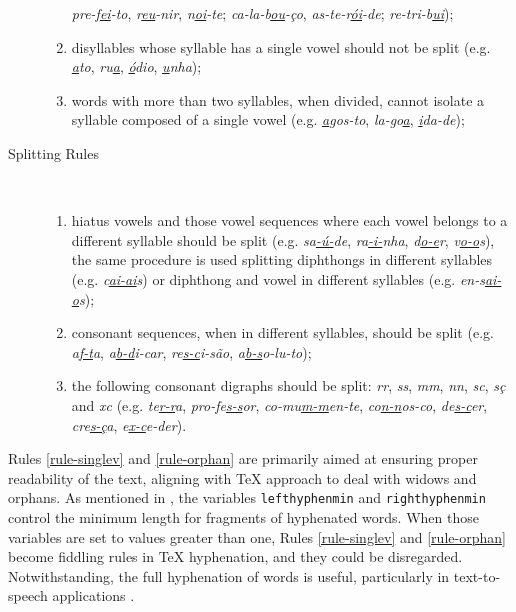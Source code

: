\begin{description}
\begin{enumerate}
	\emph{pre-f\underline{ei}-to}, \emph{r\underline{eu}-nir},
	\emph{n\underline{oi}-te}; \emph{ca-la-b\underline{ou}-ço}, 
	\emph{as-te-r\underline{ói}-de}; 
	\emph{re-tri-b\underline{ui}});
    \item\label{rule-singlev} disyllables whose syllable has a single vowel should 
	not be split (e.g. \emph{\underline{a}to}, \emph{ru\underline{a}}, 
	\emph{\underline{ó}dio}, \emph{\underline{u}nha});
    \item\label{rule-orphan} words with more than two syllables, when divided, cannot 
	isolate a syllable composed of a single vowel (e.g. \emph{\underline{a}gos-to}, 
	\emph{la-go\underline{a}}, \emph{\underline{i}da-de});
\end{enumerate}

\item[Splitting Rules]\ 

\begin{enumerate}[resume]
    \item\label{rule-hiatus} hiatus vowels and those vowel sequences where each vowel
	belongs to a different syllable should be split (e.g.
	\emph{sa\underline{-ú-}de}, \emph{ra\underline{-i-}nha}, \emph{d\underline{o-e}r},
	\emph{v\underline{o-o}s}), the same procedure is used splitting diphthongs
	in different syllables (e.g. \emph{c\underline{ai-ai}s}) or diphthong and
	vowel in different syllables (e.g. \emph{en-s\underline{ai-o}s});
    \item\label{rule-consonants} consonant sequences, when in different syllables, should
	be split (e.g. \emph{a\underline{f-t}a}, \emph{a\underline{b-d}i-car},
	\emph{re\underline{s-c}i-são}, \emph{a\underline{b-s}o-lu-to});
    \item\label{rule-digraphs} the following consonant digraphs should be split:
	\emph{rr}, \emph{ss}, \emph{mm}, \emph{nn}, \emph{sc}, \emph{sç} and
	\emph{xc} (e.g. \emph{te\underline{r-r}a}, \emph{pro-fe\underline{s-s}or},
	\emph{co-mu\underline{\emph{m-m}}en-te}, \emph{co\underline{n-n}os-co},
	\emph{de\underline{s-c}er}, \emph{cre\underline{s-ç}a}, \emph{e\underline{x-c}e-der}).
\end{enumerate}
\end{description}

Rules \ref{rule-singlev} and \ref{rule-orphan} are primarily aimed at ensuring
proper readability of the text, aligning with \TeX{} approach to deal with
widows and orphans. As mentioned in , the variables
\verb|lefthyphenmin| and \verb|righthyphenmin| control the minimum length for
fragments of hyphenated words.  When those variables are set to values greater
than one, Rules \ref{rule-singlev} and \ref{rule-orphan} become fiddling rules
in \TeX{} hyphenation, and they could be disregarded. Notwithstanding, the full
hyphenation of words is useful, particularly in text-to-speech applications
\parencite{libossek2000,trogkanis2010}.

